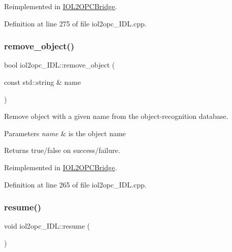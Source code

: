 Reimplemented in \hyperlink{group__iol2opc_abdb9a0e9a4edb15469cce67416ed6a2f}{I\+O\+L2\+O\+P\+C\+Bridge}.



Definition at line 275 of file iol2opc\+\_\+\+I\+D\+L.\+cpp.

\mbox{\label{classiol2opc__IDL_a69ecef7b79d9f59b9db91e4471627cb5}} 
\subsubsection{\texorpdfstring{remove\+\_\+object()}{remove\_object()}}
{\footnotesize\ttfamily bool iol2opc\+\_\+\+I\+D\+L\+::remove\+\_\+object (\begin{DoxyParamCaption}\item[{const std\+::string \&}]{name }\end{DoxyParamCaption})\hspace{0.3cm}{\ttfamily [virtual]}}



Remove object with a given name from the object-\/recognition database. 


\begin{DoxyParams}{Parameters}
{\em name} & is the object name \\
\hline
\end{DoxyParams}
\begin{DoxyReturn}{Returns}
true/false on success/failure. 
\end{DoxyReturn}


Reimplemented in \hyperlink{group__iol2opc_aab19e8834838cce5da74d31f115b9fd5}{I\+O\+L2\+O\+P\+C\+Bridge}.



Definition at line 265 of file iol2opc\+\_\+\+I\+D\+L.\+cpp.

\mbox{\label{classiol2opc__IDL_a10ec403a9dfc09503e3155227c7283bb}} 
\subsubsection{\texorpdfstring{resume()}{resume()}}
{\footnotesize\ttfamily void iol2opc\+\_\+\+I\+D\+L\+::resume (\begin{DoxyParamCaption}{ }\end{DoxyParamCaption})\hspace{0.3cm}{\ttfamily [virtual]}}



